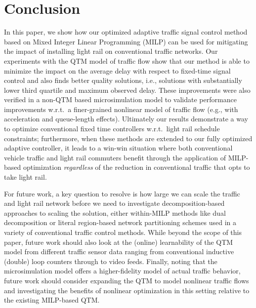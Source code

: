 \section{Conclusion}

In this paper, we show how our optimized adaptive traffic signal
control method based on Mixed Integer Linear Programming (MILP) can be
used for mitigating the impact of installing light rail on
conventional traffic networks.  Our experiments with the QTM model of
traffic flow show that our method is able to minimize the impact on
the average delay with respect to fixed-time signal control and also
finds better quality solutions, i.e., solutions with substantially
lower third quartile and maximum observed delay.  These improvements
were also verified in a non-QTM based microsimulation model to
validate performance improvements w.r.t.\ a finer-grained nonlinear
model of traffic flow (e.g., with acceleration and queue-length
effects).
%
%
Ultimately our results demonstrate a way to optimize conventional
fixed time controllers w.r.t.\ light rail schedule constraints;
furthermore, when these methods are extended to our fully optimized
adaptive controller, it leads to a win-win situation where both
conventional vehicle traffic and light rail commuters benefit through
the application of MILP-based optimization \emph{regardless} of the
reduction in conventional traffic that opts to take light rail.

For future work, a key question to resolve is how large we can scale
the traffic and light rail network before we need to investigate
decomposition-based approaches to scaling the solution, either
within-MILP methods like dual decomposition or literal region-based
network partitioning schemes used in a variety of conventional traffic
control methods.  While beyond the scope of this paper, future work
should also look at the (online) learnability of the QTM model from
different traffic sensor data ranging from conventional inductive
(double) loop counters through to video feeds.  Finally, noting that
the microsimulation model offers a higher-fidelity model of actual
traffic behavior, future work should consider expanding the QTM to
model nonlinear traffic
flows~\cite{lu2011discrete,muralidharan2009freeway,kim2002online,huang2011traffic}
and investigating the benefits of nonlinear optimization in this
setting relative to the existing MILP-based QTM.


